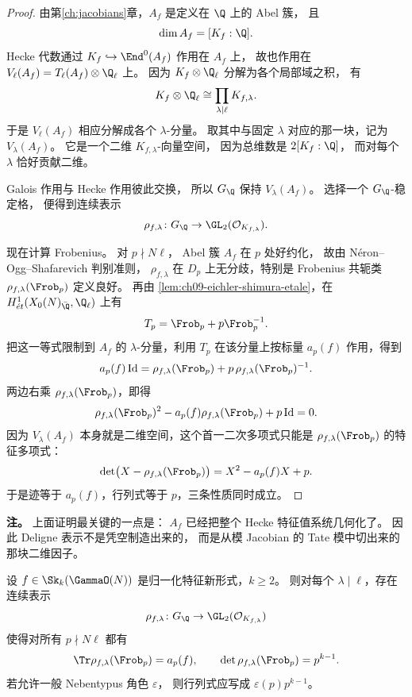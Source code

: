 \begin{proof}
由第\ref{ch:jacobians}章，$A_f$ 是定义在 $\Q$ 上的 Abel 簇，
且
\[
  \dim A_f=[K_f:\Q].
\]
Hecke 代数通过 $K_f\hookrightarrow \End^0(A_f)$ 作用在 $A_f$ 上，
故也作用在 $V_\ell(A_f)=T_\ell(A_f)\otimes \Q_\ell$ 上。
因为 $K_f\otimes \Q_\ell$ 分解为各个局部域之积，
有
\[
  K_f\otimes \Q_\ell\cong \prod_{\lambda\mid\ell} K_{f,\lambda}.
\]
于是 $V_\ell(A_f)$ 相应分解成各个 $\lambda$-分量。
取其中与固定 $\lambda$ 对应的那一块，记为 $V_\lambda(A_f)$。
它是一个二维 $K_{f,\lambda}$-向量空间，
因为总维数是 $2[K_f:\Q]$，
而对每个 $\lambda$ 恰好贡献二维。

Galois 作用与 Hecke 作用彼此交换，
所以 $G_\Q$ 保持 $V_\lambda(A_f)$。
选择一个 $G_\Q$-稳定格，
便得到连续表示
\[
  \rho_{f,\lambda}\colon G_\Q\to \GL_2(\mathcal O_{K_{f,\lambda}}).
\]

现在计算 Frobenius。
对 $p\nmid N\ell$，
Abel 簇 $A_f$ 在 $p$ 处好约化，
故由 N\'eron--Ogg--Shafarevich 判别准则，
$\rho_{f,\lambda}$ 在 $D_p$ 上无分歧，特别是 Frobenius 共轭类 $\rho_{f,\lambda}(\Frob_p)$ 定义良好。
再由 \cref{lem:ch09-eichler-shimura-etale}，在 $H^1_{\acute{e}t}(X_0(N)_{\bar{\Q}},\Q_\ell)$ 上有
\[
  T_p=\Frob_p+p\Frob_p^{-1}.
\]
把这一等式限制到 $A_f$ 的 $\lambda$-分量，利用 $T_p$ 在该分量上按标量 $a_p(f)$ 作用，得到
\[
  a_p(f)\,\mathrm{Id}=\rho_{f,\lambda}(\Frob_p)+p\,\rho_{f,\lambda}(\Frob_p)^{-1}.
\]
两边右乘 $\rho_{f,\lambda}(\Frob_p)$，即得
\[
  \rho_{f,\lambda}(\Frob_p)^2-a_p(f)\rho_{f,\lambda}(\Frob_p)+p\,\mathrm{Id}=0.
\]
因为 $V_\lambda(A_f)$ 本身就是二维空间，这个首一二次多项式只能是 $\rho_{f,\lambda}(\Frob_p)$ 的特征多项式：
\[
  \det\bigl(X-\rho_{f,\lambda}(\Frob_p)\bigr)=X^2-a_p(f)X+p.
\]
于是迹等于 $a_p(f)$，行列式等于 $p$，三条性质同时成立。
\end{proof}

\textbf{注。}
上面证明最关键的一点是：
$A_f$ 已经把整个 Hecke 特征值系统几何化了。
因此 Deligne 表示不是凭空制造出来的，
而是从模 Jacobian 的 Tate 模中切出来的那块二维因子。

\begin{theorem}
\label{thm:ch09-deligne-general}
设 $f\in \Sk_k(\GammaO(N))$ 是归一化特征新形式，$k\ge 2$。
则对每个 $\lambda\mid \ell$，存在连续表示
\[
  \rho_{f,\lambda}\colon G_\Q\to \GL_2(\mathcal O_{K_{f,\lambda}})
\]
使得对所有 $p\nmid N\ell$ 都有
\[
  \Tr\rho_{f,\lambda}(\Frob_p)=a_p(f),
  \qquad
  \det\rho_{f,\lambda}(\Frob_p)=p^{k-1}.
\]
若允许一般 Nebentypus 角色 $\varepsilon$，
则行列式应写成 $\varepsilon(p)p^{k-1}$。
\end{theorem}

